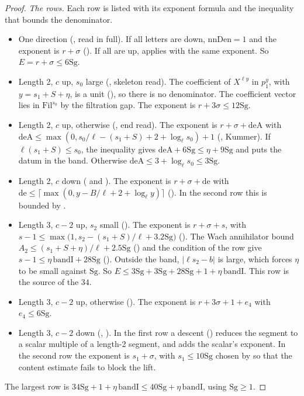 \documentclass[11pt]{article}
\newcommand{\Fil}{\mathrm{Fil}}
\newcommand{\Sg}{\mathrm{Sg}}
\theoremstyle{definition}
\theoremstyle{remark}
\begin{document}
\begin{proof}
\emph{The rows.} Each row is listed with its exponent formula and the inequality that bounds the denominator.
\begin{itemize}[leftmargin=*,itemsep=1pt]
\item One direction (, read in full). If all letters are down, $\mathrm{nnDen}=1$ and the exponent is $r+\sigma$ (). If all are up,  applies with the same exponent. So $E=r+\sigma\le6\Sg$.
\item Length 2, $c$ up, $s_0$ large (, skeleton read). The coefficient of $X^{\ell y}$ in $p_1^y$, with $y=s_1+S+\eta$, is a unit (), so there is no denominator. The coefficient vector lies in $\Fil^{s_0}$ by the filtration gap. The exponent is $r+3\sigma\le12\Sg$.
\item Length 2, $c$ up, otherwise (, end read). The exponent is $r+\sigma+\mathrm{deA}$ with $\mathrm{deA}\le\max(0,s_0/\ell-(s_1+S)+2+\log_\ell s_0)+1$ (, Kummer). If $\ell(s_1+S)\le s_0$, the inequality  gives $\mathrm{deA}+6\Sg\le\eta+9\Sg$ and puts the datum in the band. Otherwise $\mathrm{deA}\le3+\log_\ell s_0\le3\Sg$.
\item Length 2, $c$ down ( and ). The exponent is $r+\sigma+\mathrm{de}$ with $\mathrm{de}\le\lceil\max(0,y-B/\ell+2+\log_\ell y)\rceil$ (). In the second row this is bounded by .
\item Length 3, $c-2$ up, $s_2$ small (). The exponent is $r+\sigma+s$, with $s-1\le\max\bigl(1,s_2-(s_1+S)/\ell+3.2\Sg\bigr)$ (). The Wach annihilator bound $A_2\le(s_1+S+\eta)/\ell+2.5\Sg$ () and the condition of the row give $s-1\le\eta\,\mathrm{bandI}+28\Sg$ (). Outside the band, $\lvert\ell s_2-b\rvert$ is large, which forces $\eta$ to be small against $\Sg$. So $E\le3\Sg+3\Sg+28\Sg+1+\eta\,\mathrm{bandI}$. This row is the source of the $34$.
\item Length 3, $c-2$ up, otherwise (). The exponent is $r+3\sigma+1+e_4$ with $e_4\le6\Sg$.
\item Length 3, $c-2$ down (, ). In the first row a descent () reduces the segment to a scalar multiple of a length-2 segment, and  adds the scalar's exponent. In the second row the exponent is $s_1+\sigma$, with $s_1\le10\Sg$ chosen by  so that the content estimate fails to block the lift.
\end{itemize}
The largest row is $34\Sg+1+\eta\,\mathrm{bandI}\le40\Sg+\eta\,\mathrm{bandI}$, using $\Sg\ge1$.
\end{proof}
\end{document}
